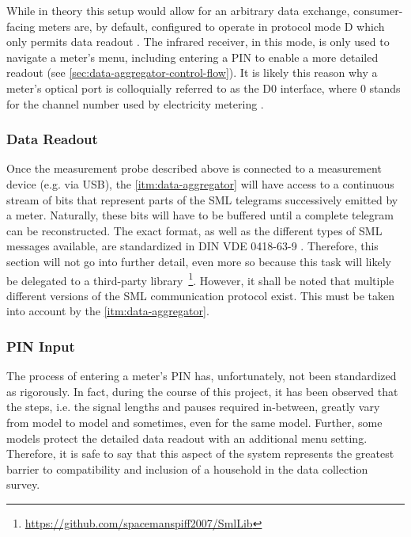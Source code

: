 While in theory this setup would allow for an arbitrary data exchange, consumer-facing meters are, by default, configured to operate in protocol mode D which only permits data readout \cite[p.~7]{nzr2011ehz} \cite[p.~35]{iec2002d0}. The infrared receiver, in this mode, is only used to navigate a meter's menu, including entering a \acs{PIN} to enable a more detailed readout (see \autoref{sec:data-aggregator-control-flow}). It is likely this reason why a meter's optical port is colloquially referred to as the D0 interface, where 0 stands for the channel number used by electricity metering \cite[p.~119]{iec2002d0}.


\subsubsection{Data Readout}
\label{sec:meter-data-readout}

Once the measurement probe described above is connected to a measurement device (e.g. via USB), the \ref{itm:data-aggregator} will have access to a continuous stream of bits that represent parts of the \acs{SML} telegrams successively emitted by a meter. Naturally, these bits will have to be buffered until a complete telegram can be reconstructed. The exact format, as well as the different types of \acs{SML} messages available, are standardized in \acs{DIN} \acs{VDE} 0418-63-9 \cite{vde2018sml}. Therefore, this section will not go into further detail, even more so because this task will likely be delegated to a third-party library~\footnote{\url{https://github.com/spacemanspiff2007/SmlLib}}. However, it shall be noted that multiple different versions of the \acs{SML} communication protocol exist. This must be taken into account by the \ref{itm:data-aggregator}.


\subsubsection{\acs{PIN} Input}
\label{sec:meter-pin-input}

The process of entering a meter's \acs{PIN} has, unfortunately, not been standardized as rigorously. In fact, during the course of this project, it has been observed that the steps, i.e. the signal lengths and pauses required in-between, greatly vary from model to model and sometimes, even for the same model. Further, some models protect the detailed data readout with an additional menu setting. Therefore, it is safe to say that this aspect of the system represents the greatest barrier to compatibility and inclusion of a household in the data collection survey.

